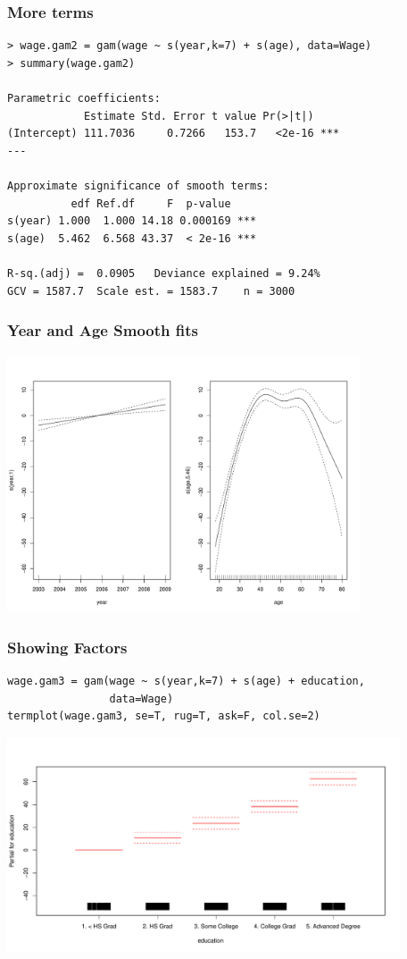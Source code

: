 \documentclass[]{beamer}\usepackage[]{graphicx}\usepackage[]{color}
\begin{document}
\begin{frame}[fragile]\frametitle{More terms}
\begin{verbatim}
> wage.gam2 = gam(wage ~ s(year,k=7) + s(age), data=Wage)
> summary(wage.gam2)

Parametric coefficients:
            Estimate Std. Error t value Pr(>|t|)
(Intercept) 111.7036     0.7266   153.7   <2e-16 ***
---

Approximate significance of smooth terms:
          edf Ref.df     F  p-value
s(year) 1.000  1.000 14.18 0.000169 ***
s(age)  5.462  6.568 43.37  < 2e-16 ***

R-sq.(adj) =  0.0905   Deviance explained = 9.24%
GCV = 1587.7  Scale est. = 1583.7    n = 3000
\end{verbatim}
\end{frame}
\begin{frame}\frametitle{Year and Age Smooth fits}
  \centerline{\includegraphics[height=3in]{gam-age-year}}
\end{frame}

\begin{frame}[fragile]\frametitle{Showing Factors}
\begin{verbatim}
wage.gam3 = gam(wage ~ s(year,k=7) + s(age) + education,
                data=Wage)
termplot(wage.gam3, se=T, rug=T, ask=F, col.se=2)
\end{verbatim}
\centerline{\includegraphics[height=2.5in]{edu-term}}
\end{frame}
\end{document}
